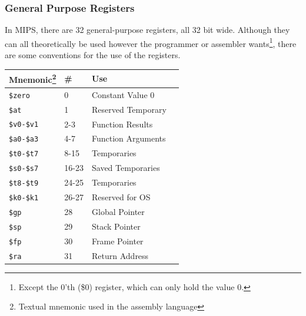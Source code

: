 \subsubsection{General Purpose Registers}
In MIPS, there are 32 general-purpose registers, all 32 bit wide. Although
they
can all theoretically be used however the programmer or assembler
wants\footnote{Except the 0'th (\$0) register, which can only hold the
value 0.}, there
are some conventions for the use of the registers.
\begin{center}
    \begin{tabular}{ | l | l | l | c |}
    \hline
	\textbf{Mnemonic\footnote{Textual mnemonic used in the assembly language}}%
		 & \textbf{\#} & \textbf{Use} \\ \hline \hline
	\texttt{\$zero}		& 0	& Constant Value 0 \\ \hline
	\texttt{\$at}		& 1	& Reserved Temporary \\ \hline
	\texttt{\$v0-\$v1}	& 2-3	& Function Results \\ \hline
	\texttt{\$a0-\$a3}	& 4-7	& Function Arguments \\ \hline
	\texttt{\$t0-\$t7}	& 8-15	& Temporaries  \\ \hline
	\texttt{\$s0-\$s7}	& 16-23 & Saved Temporaries \\ \hline
	\texttt{\$t8-\$t9}	& 24-25 & Temporaries \\ \hline
	\texttt{\$k0-\$k1}	& 26-27 & Reserved for OS \\ \hline
	\texttt{\$gp}		& 28	& Global Pointer \\ \hline
	\texttt{\$sp}		& 29	& Stack Pointer \\ \hline
	\texttt{\$fp}		& 30	& Frame Pointer \\ \hline
	\texttt{\$ra}		& 31	& Return Address \\ \hline
    \end{tabular}
\end{center}

